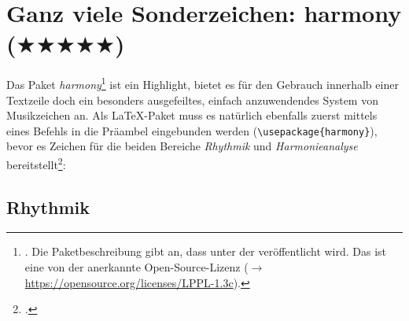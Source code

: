 %
%
%




\section{Ganz viele Sonderzeichen: harmony ($\bigstar\bigstar\bigstar\bigstar\bigstar$)}
\label{Harmony}
Das Paket \textit{harmony}\footnote{\cite[vgl.][\nopage wp.]{CtanHarmony2018a}.
Die Paketbeschreibung gibt an, dass  unter der  veröffentlicht wird. Das ist eine von der  anerkannte
Open-Source-Lizenz ($\rightarrow$ \href{https://opensource.org/licenses/LPPL-1.3c}
{https://opensource.org/licenses/LPPL-1.3c}).} ist ein Highlight, bietet es für
den Gebrauch innerhalb einer Textzeile doch ein besonders ausgefeiltes, einfach
anzuwendendes System von Musikzeichen an. Als \LaTeX-Paket muss es natürlich
ebenfalls zuerst mittels eines Befehls in die Präambel eingebunden werden
(\small \texttt{\textbackslash{usepackage\{harmony\}}}), bevor es Zeichen für die beiden
Bereiche \textit{Rhythmik} und \textit{Harmonieanalyse}
bereitstellt\footcite[Für einen vollen Überblick über den Zeichenvorrat und die
Kombinationsmöglichkeiten vgl.][4ff]{WegWeg2007a}:

\subsection{\small Rhythmik}

